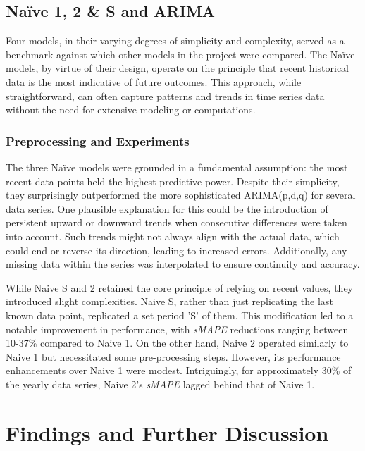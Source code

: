 \documentclass[conference]{IEEEtran}
\begin{document}
\subsection{Naïve 1, 2 \& S and ARIMA}

Four models, in their varying degrees of simplicity and complexity, served as a benchmark against which other models in the project were compared. The Naïve models, by virtue of their design, operate on the principle that recent historical data is the most indicative of future outcomes\cite{statistical}. This approach, while straightforward, can often capture patterns and trends in time series data without the need for extensive modeling or computations. 

\subsubsection{Preprocessing and Experiments}

The three Naïve models were grounded in a fundamental assumption: the most recent data points held the highest predictive power\cite{statistical}. Despite their simplicity, they surprisingly outperformed the more sophisticated ARIMA(p,d,q) for several data series.  One plausible explanation for this could be the introduction of persistent upward or downward trends when consecutive differences were taken into account. Such trends might not always align with the actual data, which could end or reverse its direction, leading to increased errors. Additionally, any missing data within the series was interpolated to ensure continuity and accuracy.

While Naive S and 2 retained the core principle of relying on recent values, they introduced slight complexities. Naive S, rather than just replicating the last known data point, replicated a set period 'S' of them. This modification led to a notable improvement in performance, with \textit{sMAPE} reductions ranging between 10-37\% compared to Naive 1. On the other hand, Naive 2 operated similarly to Naive 1 but necessitated some pre-processing steps. However, its performance enhancements over Naive 1 were modest. Intriguingly, for approximately 30\% of the yearly data series, Naive 2's \textit{sMAPE} lagged behind that of Naive 1.

\section{Findings and Further Discussion}
\end{document}
